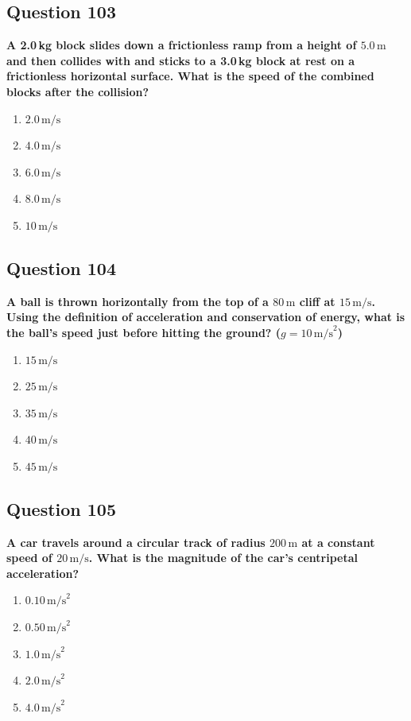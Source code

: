 \documentclass[12pt,letterpaper]{article}
\begin{document}
\subsection{Question 103}

\begin{questionbox}
\textbf{A 2.0\,kg block slides down a frictionless ramp from a height of $5.0\,\text{m}$ and then collides with and sticks to a 3.0\,kg block at rest on a frictionless horizontal surface. What is the speed of the combined blocks after the collision?}

\begin{enumerate}[label=\alph*)]
    \item $2.0\,\text{m/s}$
    \item $4.0\,\text{m/s}$
    \item $6.0\,\text{m/s}$
    \item $8.0\,\text{m/s}$
    \item $10\,\text{m/s}$
\end{enumerate}
\end{questionbox}

\subsection{Question 104}

\begin{questionbox}
\textbf{A ball is thrown horizontally from the top of a $80\,\text{m}$ cliff at $15\,\text{m/s}$. Using the definition of acceleration and conservation of energy, what is the ball's speed just before hitting the ground? ($g = 10\,\text{m/s}^2$)}

\begin{enumerate}[label=\alph*)]
    \item $15\,\text{m/s}$
    \item $25\,\text{m/s}$
    \item $35\,\text{m/s}$
    \item $40\,\text{m/s}$
    \item $45\,\text{m/s}$
\end{enumerate}
\end{questionbox}

\subsection{Question 105}

\begin{questionbox}
\textbf{A car travels around a circular track of radius $200\,\text{m}$ at a constant speed of $20\,\text{m/s}$. What is the magnitude of the car's centripetal acceleration?}

\begin{enumerate}[label=\alph*)]
    \item $0.10\,\text{m/s}^2$
    \item $0.50\,\text{m/s}^2$
    \item $1.0\,\text{m/s}^2$
    \item $2.0\,\text{m/s}^2$
    \item $4.0\,\text{m/s}^2$
\end{enumerate}
\end{questionbox}
\end{document}

